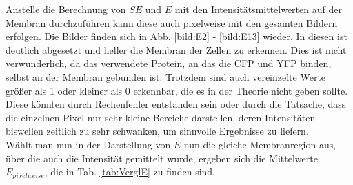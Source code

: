 Anstelle die Berechnung von $SE$ und $E$ mit den Intensitätsmittelwerten auf der Membran durchzuführen kann diese auch pixelweise 
mit den gesamten Bildern erfolgen. Die Bilder finden sich in Abb. \ref{bild:E2} - \ref{bild:E13} wieder. In diesen ist deutlich abgesetzt 
und heller die Membran der Zellen zu erkennen. Dies ist nicht verwunderlich, da das verwendete Protein, an das die CFP und YFP binden, selbst 
an der Membran gebunden ist. Trotzdem sind auch vereinzelte Werte größer als 1 oder kleiner als 0 erkennbar, die es in der Theorie nicht geben sollte. Diese könnten 
durch Rechenfehler entstanden sein oder durch die Tatsache, dass die einzelnen Pixel nur sehr kleine Bereiche darstellen, deren Intensitäten bisweilen zeitlich zu sehr schwanken, um 
sinnvolle Ergebnisse zu liefern.\\
Wählt man nun in der Darstellung von $E$ nun die gleiche 
Membranregion aus, über die auch die Intensität gemittelt wurde, ergeben sich die Mittelwerte $E_{pixelweise}$, die in Tab. \ref{tab:VerglE} 
zu finden sind.

